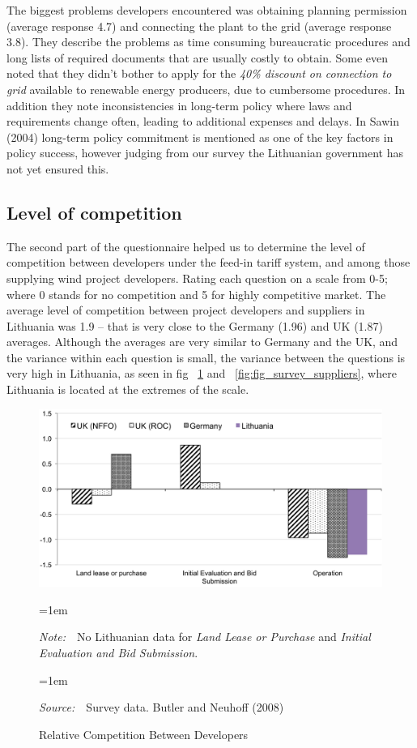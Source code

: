 \documentclass[a4paper, 12pt]{article}
\newcommand{\Figtext}[1]{%
	\begin{tablenotes}[para,flushleft]
		\hangindent=1em
		\footnotesize
		\raggedright
		#1
	\end{tablenotes}
}
\newcommand{\Fignote}[1]{\Figtext{\emph{Note:~}~#1}}
\newcommand{\Figsource}[1]{\Figtext{\emph{Source:~}~#1}}
\begin{document}
The biggest problems developers encountered was obtaining planning permission (average response 4.7) and connecting the plant to the grid (average response 3.8). They describe the problems as time consuming bureaucratic procedures and long lists of required documents that are usually costly to obtain. Some even noted that they didn’t bother to apply for the \emph{40\% discount on connection to grid} available to renewable energy producers, due to cumbersome procedures. In addition they note inconsistencies in long-term policy where laws and requirements change often, leading to additional expenses and delays. In Sawin (2004) long-term policy commitment is mentioned as one of the key factors in policy success, however judging from our survey the Lithuanian government has not yet ensured this.

\subsection{Level of competition}
The second part of the questionnaire helped us to determine the level of competition between developers under the feed-in tariff system, and among those supplying wind project developers. Rating each question on a scale from 0-5; where 0 stands for no competition and 5 for highly competitive market. The average level of competition between project developers and suppliers in Lithuania was 1.9 – that is very close to the Germany (1.96) and UK (1.87) averages. Although the averages are very similar to Germany and the UK, and the variance within each question is small, the variance between the questions is very high in Lithuania, as seen in fig ~\ref{fig:fig_survey_competition} and ~\ref{fig:fig_survey_suppliers}, where Lithuania is located at the extremes of the scale.

\begin{figure}
	\centering
	\caption{Relative Competition Between Developers}
	\includegraphics[width=1\textwidth]{fig_survey_competition}
	\Fignote{No Lithuanian data for \emph{Land Lease or Purchase} and \emph{Initial Evaluation and Bid Submission}.}
	\Figsource{Survey data. Butler and Neuhoff (2008)}
	\label{fig:fig_survey_competition}
\end{figure}
\end{document}
